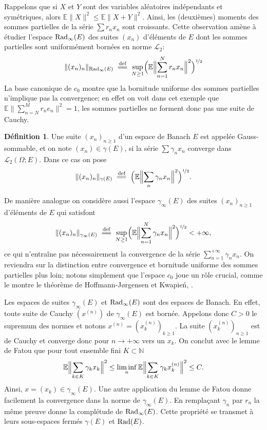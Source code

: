 \documentclass{smfart}
\theoremstyle{plain}
\theoremstyle{definition}
\newtheorem{definition}[theorem]{Définition}
\newcommand{\EE}{\mathbb E}
\newcommand\N{{\mathbb N}}
\newcommand{\demi}{{\nicefrac{1}{2}}}
\newcommand {\RADcv}{\text{\rm Rad}}
\newcommand {\GAUSScv} {\gamma}
\newcommand {\RADbdd}{\text{\rm Rad}{}_\infty}
\newcommand {\GAUSSbdd} {\gamma_\infty}
\newcommand {\defequal} {\; \overset{\text{def}}{=\joinrel=} \;}
\newcommand {\norm}[1] {\| #1 \|}               %
\newcommand {\bignorm}[1]{\bigl\| #1 \bigr\|}
\newcommand {\Bignorm}[1]{\Bigl\| #1 \Bigr\|}
\newcommand {\ELL} {{\mathcal L}}
\begin{document}
\noindent Rappelons que si $X$ et $Y$ sont des variables aléatoires
indépendants et symétriques, alors $\EE \norm{ X }^2 \le \EE \norm{ X +
  Y}^2$. Ainsi, les (deuxièmes) moments des sommes partielles de la
série $\sum r_n x_n$ sont croissants. Cette observation amène à
étudier l'espace $\RADbdd(E)$ des suites $(x_n)$ d'éléments de $E$ dont les sommes partielles sont
uniformément bornées en norme $\ELL_2$:
\[
   \norm{  (x_n)_n }_{\RADbdd(E)} \defequal  \sup_{N \ge 1} \Bigl( \EE \Bignorm{ \sum_{n = 1}^N r_n x_n }^2 \Bigr)^\demi
\]
La base canonique de $c_0$ montre que la bornitude uniforme des sommes
partielles n'implique pas la convergence; en effet on voit dans cet
exemple que $\EE \bignorm{ \sum_{n=N}^M r_n e_n }^2 = 1$, les sommes
partielles ne forment donc pas une suite de Cauchy. 

\begin{definition}\label{def:GAUSS}
  Une suite $(x_n)_{n\ge 1}$ d'un espace de Banach $E$ est appelée
  Gauss-sommable, et on note $(x_n) \in \GAUSScv(E)$, si la série $\sum
  \gamma_n x_n$ converge dans $\ELL_2(\Omega; E)$. Dans ce cas on pose
\[
   \norm{  (x_n)_n }_{\GAUSScv(E)} \defequal   \Bigl( \EE \Bignorm{ \sum_{n} \gamma_n x_n }^2 \Bigr)^\demi.
\]
\end{definition}

\noindent De manière analogue on considère aussi l'espace $\GAUSSbdd(E)$ des suites $(x_n)_{n\ge 1}$ d'éléments de $E$ qui satisfont
\[
   \norm{  (x_n)_n }_{\GAUSSbdd(E)} \defequal  \sup_{N\ge 1} \Bigl( \EE \Bignorm{ \sum_{n=1}^N \gamma_n x_n }^2 \Bigr)^\demi < +\infty,
\]
ce qui n'entraîne pas nécessairement la convergence de la série $\sum_{n=1}^{+\infty}\gamma_nx_n.$  On reviendra sur la distinction
entre convergence et bornitude uniforme des sommes partielles plus
loin; notons simplement que l'espace $c_0$ joue un rôle crucial, comme le
montre le théorème de Hoffmann-J\o{}rgensen et Kwapień, \cite{HK}.


\noindent Les espaces de suites $\GAUSSbdd(E)$ et $\RADbdd(E)$ sont des espaces de Banach. 
 En effet, toute suite de Cauchy
 $(x^{(n)})$ de $\GAUSSbdd(E)$ est bornée. Appelons donc $C>0$ le supremum
 des normes et notons $x^{(n)} = (x^{(n)}_k)_{k\ge 1}$. La suite
 $(x^{(n)}_k)_{n\ge 1}$ est de Cauchy et converge donc pour
 $n\to+\infty$ vers un $x_k$. On conclut avec le lemme de Fatou que pour
 tout ensemble fini $K\subset \N$
 \[
   \EE \Bignorm{ \sum_{k \in K} \gamma_k x_k  }^2 \le \liminf_n \EE \Bignorm{ \sum_{k \in K} \gamma_k x^{(n)}_k  }^2 \le C.
 \]
 Ainsi, $x = (x_k) \in \GAUSSbdd(E)$. Une autre application du lemme de
 Fatou donne facilement la convergence dans la norme de $\GAUSSbdd(E)$.
 En remplaçant $\gamma_n$ par $r_n$ la même preuve donne la complétude
 de $\RADbdd(E)$.  
\noindent  Cette propriété se transmet à leurs sous-espaces fermés $\GAUSScv(E)$ et
$\RADcv(E)$.
\end{document}

